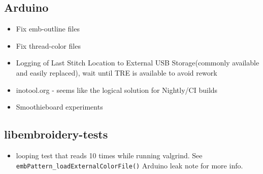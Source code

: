\documentclass[11pt]{report}
\begin{document}
\subsection{Arduino}

\begin{itemize}
\item Fix emb-outline files
\item Fix thread-color files
\item Logging of Last Stitch Location to External USB Storage(commonly available and easily replaced), wait until TRE is available to avoid rework
\item inotool.org - seems like the logical solution for Nightly/CI builds
\item Smoothieboard experiments
\end{itemize}

\subsection{libembroidery-tests}

\begin{itemize}
\item looping test that reads 10 times while running valgrind. See \texttt{embPattern\_loadExternalColorFile()} Arduino leak note for more info.
\end{itemize}
\end{document}

